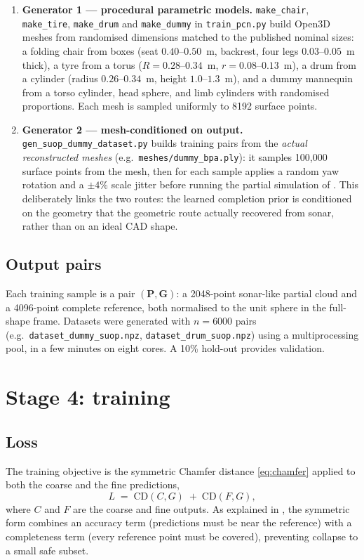 \begin{enumerate}
  \item \textbf{Generator 1 --- procedural parametric models.}
  \texttt{make\_chair}, \texttt{make\_tire}, \texttt{make\_drum} and
  \texttt{make\_dummy} in \texttt{train\_pcn.py} build Open3D meshes from
  randomised dimensions matched to the published \suop{} nominal sizes: a
  folding chair from boxes (seat $0.40$--$0.50$~m, backrest, four legs
  $0.03$--$0.05$~m thick), a tyre from a torus ($R = 0.28$--$0.34$~m,
  $r = 0.08$--$0.13$~m), a drum from a cylinder (radius $0.26$--$0.34$~m,
  height $1.0$--$1.3$~m), and a dummy mannequin from a torso cylinder, head
  sphere, and limb cylinders with randomised proportions. Each mesh is sampled
  uniformly to 8192 surface points.
  \item \textbf{Generator 2 --- mesh-conditioned on \routeA{} output.}
  \texttt{gen\_suop\_dummy\_dataset.py} builds training pairs from the
  \emph{actual reconstructed \routeA{} meshes} (e.g.\ \texttt{meshes/dummy\_bpa.ply}):
  it samples 100{,}000 surface points from the mesh, then for each sample
  applies a random yaw rotation and a $\pm4\%$ scale jitter before running the
  partial simulation of . This deliberately links the
  two routes: the learned completion prior is conditioned on the geometry that
  the geometric route actually recovered from sonar, rather than on an ideal
  CAD shape.
\end{enumerate}

\subsection{Output pairs}
Each training sample is a pair $(\mathbf{P}, \mathbf{G})$: a 2048-point
sonar-like partial cloud and a 4096-point complete reference, both normalised
to the unit sphere in the full-shape frame. Datasets were generated with
$n = 6000$ pairs (e.g.\ \texttt{dataset\_dummy\_suop.npz},
\texttt{dataset\_drum\_suop.npz}) using a multiprocessing pool, in a few
minutes on eight cores. A 10\% hold-out provides validation.

\section{Stage 4: training}
\label{sec:routeB_training}

\subsection{Loss}
The training objective is the symmetric Chamfer distance
\eqref{eq:chamfer} applied to both the coarse and the fine predictions,
\begin{equation}
  L \;=\; \mathrm{CD}(C, G) \;+\; \mathrm{CD}(F, G),
  \label{eq:routeB_loss}
\end{equation}
where $C$ and $F$ are the coarse and fine outputs. As explained in
, the symmetric form combines an accuracy term
(predictions must be near the reference) with a completeness term (every
reference point must be covered), preventing collapse to a small safe subset.

